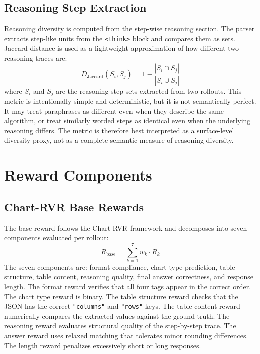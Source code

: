 \documentclass{iutbscthesis}
\begin{document}
\subsection{Reasoning Step Extraction}

Reasoning diversity is computed from the step-wise reasoning section. The parser extracts step-like units from the \texttt{<think>} block and compares them as sets. Jaccard distance is used as a lightweight approximation of how different two reasoning traces are:
\begin{equation}
    D_{\text{Jaccard}}(S_i, S_j) = 1 - \frac{|S_i \cap S_j|}{|S_i \cup S_j|}
\end{equation}
where $S_i$ and $S_j$ are the reasoning step sets extracted from two rollouts. This metric is intentionally simple and deterministic, but it is not semantically perfect. It may treat paraphrases as different even when they describe the same algorithm, or treat similarly worded steps as identical even when the underlying reasoning differs. The metric is therefore best interpreted as a surface-level diversity proxy, not as a complete semantic measure of reasoning diversity.

\section{Reward Components}

\subsection{Chart-RVR Base Rewards}

The base reward follows the Chart-RVR framework \cite{sinha2025chartrvr} and decomposes into seven components evaluated per rollout:
\begin{equation}
    R_{\text{base}} = \sum_{k=1}^{7} w_k \cdot R_k
\end{equation}
The seven components are: format compliance, chart type prediction, table structure, table content, reasoning quality, final answer correctness, and response length. The format reward verifies that all four tags appear in the correct order. The chart type reward is binary. The table structure reward checks that the JSON has the correct \texttt{"columns"} and \texttt{"rows"} keys. The table content reward numerically compares the extracted values against the ground truth. The reasoning reward evaluates structural quality of the step-by-step trace. The answer reward uses relaxed matching that tolerates minor rounding differences. The length reward penalizes excessively short or long responses.
\end{document}
